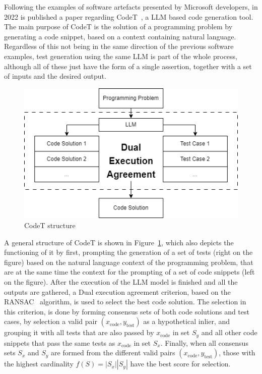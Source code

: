\documentclass[%
  chapterprefix=false,%
  open=right,%
  twoside=true,%
  paper=a4,%
  logofile={Figures/logo.png},%
  thesistype=master,%
  UKenglish,%
]{se2thesis}
\begin{document}
Following the examples of software artefacts presented by Microsoft developers, in 2022 is published a paper regarding CodeT~\cite{DBLP:journals/corr/abs-2207-10397}, a LLM based code generation tool.
The main purpose of CodeT is the solution of a programming problem by generating a code snippet, based on a context containing natural language.
Regardless of this not being in the same direction of the previous software examples, test generation using the same LLM is part of the whole process, although all of these just have the form of a single assertion, together with a set of inputs and the desired output.

\begin{figure}[tb]
  \centering 
  \includegraphics[width=.99\textwidth]{Figures/codet.png}
  \caption{CodeT structure}\label{fig:codet}
\end{figure}

A general structure of CodeT is shown in Figure~\ref{fig:codet}, which also depicts the functioning of it by first, prompting the generation of a set of tests (right on the figure) based on the natural language context of the programming problem, that are at the same time the context for the prompting of a set of code snippets (left on the figure).
After the execution of the LLM model is finished and all the outputs are gathered, a Dual execution agreement criterion, based on the RANSAC~\cite{DBLP:journals/cacm/FischlerB81} algorithm, is used to select the best code solution.
The selection in this criterion, is done by forming consensus sets of both code solutions and test cases, by selection a valid pair \((x_\text{code}, y_\text{test})\) as a hypothetical inlier, and grouping it with all tests that are also passed by \(x_\text{code}\) in set \(S_y\) and all other code snippets that pass the same tests as \(x_\text{code}\) in set \(S_x\).
Finally, when all consensus sets \(S_x\) and \(S_y\) are formed from the different valid pairs \((x_\text{code}, y_\text{test})\), those with the highest cardinality \(f(S) = |S_x||S_y|\) have the best score for selection.
\end{document}
